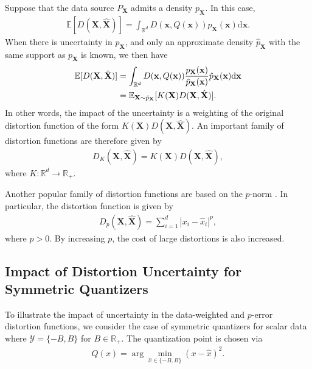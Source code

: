 \documentclass[conference]{IEEEtran}
\begin{document}
Suppose that the data source $P_{\mathbf{X}}$ admits a density $p_{\mathbf{X}}$. In this case, 
\begin{align}
	\mathbb{E}[D(\mathbf{X},\hat{\mathbf{X}})] = \int_{\mathbb{R}^d} D(\mathbf{x},Q(\mathbf{x}))p_{\mathbf{X}}(\mathbf{x})\mathrm{d}\mathbf{x}.
\end{align}
When there is uncertainty in $p_{\mathbf{X}}$, and only an approximate density $\hat{p}_{\mathbf{X}}$ with the same support as $p_{\mathbf{X}}$ is known, we then have 
\begin{align}
	\mathbb{E}[D(\mathbf{X},\hat{\mathbf{X}})] &= \int_{\mathbb{R}^d} D(\mathbf{x},Q(\mathbf{x}))\frac{p_{\mathbf{X}}(\mathbf{x})}{\hat{p}_{\mathbf{X}}(\mathbf{x})}\hat{p}_{\mathbf{X}}(\mathbf{x})\mathrm{d}\mathbf{x}\notag\\
	&= \mathbb{E}_{\mathbf{X} \sim \hat{p}_{\mathbf{X}}}[K(\mathbf{X})D(\mathbf{X},\hat{\mathbf{X}})].
\end{align}
In other words, the impact of the uncertainty is a weighting of the original distortion function of the form $K(\mathbf{X})D(\mathbf{X},\hat{\mathbf{X}})$. An important family of distortion functions are therefore given by 
\begin{align}\label{eq:weight_distort}
	D_K(\mathbf{X},\hat{\mathbf{X}}) = K(\mathbf{X})D(\mathbf{X},\hat{\mathbf{X}}),
\end{align}
where $K:\mathbb{R}^d \rightarrow \mathbb{R}_+$. 

Another popular family of distortion functions are based on the $p$-norm \cite{Linde1980algorithm,Nahshan2021loss}. In particular, the distortion function is given by 
\begin{align}\label{eq:p_norm}
	D_p(\mathbf{X},\hat{\mathbf{X}}) = \sum_{i=1}^d |x_i - \hat{x}_i|^p,
\end{align}
where $p > 0$. By increasing $p$, the cost of large distortions is also increased. 

\subsection{Impact of Distortion Uncertainty for Symmetric Quantizers}

To illustrate the impact of uncertainty in the data-weighted and $p$-error distortion functions, we consider the case of symmetric quantizers for scalar data where $\mathcal{Y} = \{-B,B\}$ for $B \in \mathbb{R}_+$. The quantization point is chosen via 
\begin{align}
	Q(x) = \arg\min_{\hat{x} \in \{-B,B\}} (x - \hat{x})^2.
\end{align}
\end{document}
